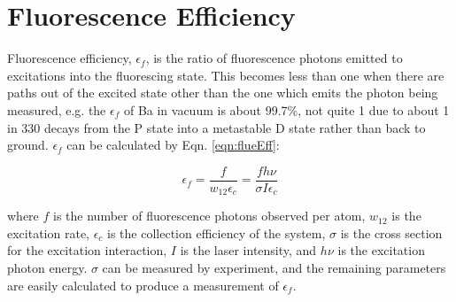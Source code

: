 \section{Fluorescence Efficiency}

Fluorescence efficiency, $\epsilon_{f}$, is the ratio of fluorescence photons emitted to excitations into the fluorescing state.  This becomes less than one when there are paths out of the excited state other than the one which emits the photon being measured, e.g. the $\epsilon_{f}$ of Ba in vacuum is about 99.7\%, not quite 1 due to about 1 in 330 decays from the P state into a metastable D state rather than back to ground.  $\epsilon_{f}$ can be calculated by Eqn. \ref{eqn:flueEff}:

\begin{equation}
\epsilon_{f} = \frac{f}{w_{12} \epsilon_{c}} = \frac{f h \nu}{\sigma I \epsilon_{c}}
\label{eqn:flueEff}
\end{equation}

\noindent
where $f$ is the number of fluorescence photons observed per atom, $w_{12}$ is the excitation rate, $\epsilon_{c}$ is the collection efficiency of the system, $\sigma$ is the cross section for the excitation interaction, $I$ is the laser intensity, and $h \nu$ is the excitation photon energy.  $\sigma$ can be measured by experiment, and the remaining parameters are easily calculated to produce a measurement of $\epsilon_{f}$.